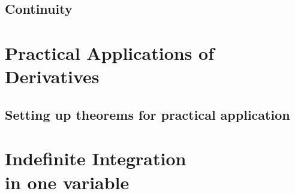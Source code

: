 \chapter{Continuity}










\part{Practical Applications of Derivatives}

\chapter{Setting up theorems for practical application}







\part{Indefinite Integration\\ \quad in one variable}








\printbibliography[title = {Aliquam}]



